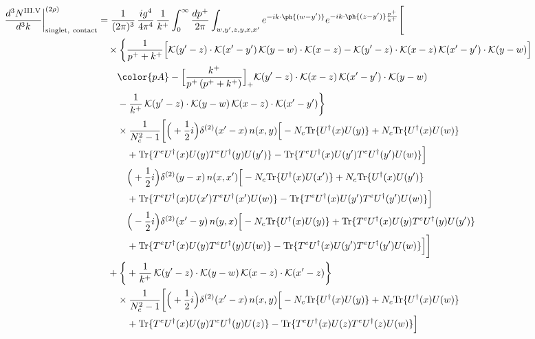 \begin{align}
\frac{d^{3}N^{\rm III.V}}{d^{3}k}\bigg|^{(2\rho)}_{\rm singlet,\ contact}&=\frac{1}{(2\pi)^{3}}\,\frac{ig^{4}}{4\pi^{4}}\,\frac{1}{k^{+}}\int_{0}^{\infty}\frac{dp^{+}}{2\pi}\int_{w,y',z,y,x,x'}e^{-ik\cdot\ph{(w-y')}}e^{-ik\cdot\ph{(z-y')}\frac{p^{+}}{k^{+}}}\Bigg[\notag\\
&\quad\times\bigg\{\frac{1}{p^{+}+k^{+}}\Big[\mathcal{K}(y'-z)\cdot\mathcal{K}(x'-y')\,\mathcal{K}(y-w)\cdot\mathcal{K}(x-z)-\mathcal{K}(y'-z)\cdot\mathcal{K}(x-z)\,\mathcal{K}(x'-y')\cdot\mathcal{K}(y-w)\Big]\notag\\
&\qquad{\color{pA}-\Big[\frac{k^{+}}{p^{+}\,(p^{+}+k^{+})}\Big]_{+}\mathcal{K}(y'-z)\cdot\mathcal{K}(x-z)\,\mathcal{K}(x'-y')\cdot\mathcal{K}(y-w)}\notag\\
&\qquad-\frac{1}{k^{+}}\,\mathcal{K}(y'-z)\cdot\mathcal{K}(y-w)\,\mathcal{K}(x-z)\cdot\mathcal{K}(x'-y')\bigg\}\notag\\
&\qquad\times \frac{1}{N_{c}^{2}-1}\bigg[\Big(+\frac{1}{2}i\Big)\delta^{(2)}(x'-x)\,n(x,y)\Big[-N_{c}{\rm Tr}\{U^{\dagger}(x)U(y)\}+N_{c}{\rm Tr}\{U^{\dagger}(x)U(w)\}\notag\\
&\qquad\quad +{\rm Tr}\{T^{e}U^{\dagger}(x)U(y)T^{e}U^{\dagger}(y)U(y')\}-{\rm Tr}\{T^{e}U^{\dagger}(x)U(y')T^{e}U^{\dagger}(y')U(w)\}\Big]\notag\\
&\qquad\quad \Big(+\frac{1}{2}i\Big)\delta^{(2)}(y-x)\,n(x,x')\Big[-N_{c}{\rm Tr}\{U^{\dagger}(x)U(x')\}+N_{c}{\rm Tr}\{U^{\dagger}(x)U(y')\}\notag\\
&\qquad\quad +{\rm Tr}\{T^{e}U^{\dagger}(x)U(x')T^{e}U^{\dagger}(x')U(w)\}-{\rm Tr}\{T^{e}U^{\dagger}(x)U(y')T^{e}U^{\dagger}(y')U(w)\}\Big]\notag\\
&\qquad\quad \Big(-\frac{1}{2}i\Big)\delta^{(2)}(x'-y)\,n(y,x)\Big[-N_{c}{\rm Tr}\{U^{\dagger}(x)U(y)\}+{\rm Tr}\{T^{e}U^{\dagger}(x)U(y)T^{e}U^{\dagger}(y)U(y')\}\notag\\
&\qquad\quad +{\rm Tr}\{T^{e}U^{\dagger}(x)U(y)T^{e}U^{\dagger}(y)U(w)\}-{\rm Tr}\{T^{e}U^{\dagger}(x)U(y')T^{e}U^{\dagger}(y')U(w)\}\Big]\bigg]\notag\\
&\quad+\bigg\{+\frac{1}{k^{+}}\,\mathcal{K}(y'-z)\cdot\mathcal{K}(y-w)\,\mathcal{K}(x-z)\cdot\mathcal{K}(x'-z)\bigg\}\notag\\
&\qquad\times \frac{1}{N_{c}^{2}-1}\bigg[\Big(+\frac{1}{2}i\Big)\delta^{(2)}(x'-x)\,n(x,y)\Big[-N_{c}{\rm Tr}\{U^{\dagger}(x)U(y)\}+N_{c}{\rm Tr}\{U^{\dagger}(x)U(w)\}\notag\\
&\qquad\quad +{\rm Tr}\{T^{e}U^{\dagger}(x)U(y)T^{e}U^{\dagger}(y)U(z)\}-{\rm Tr}\{T^{e}U^{\dagger}(x)U(z)T^{e}U^{\dagger}(z)U(w)\}\Big]\notag\\

\end{align}
